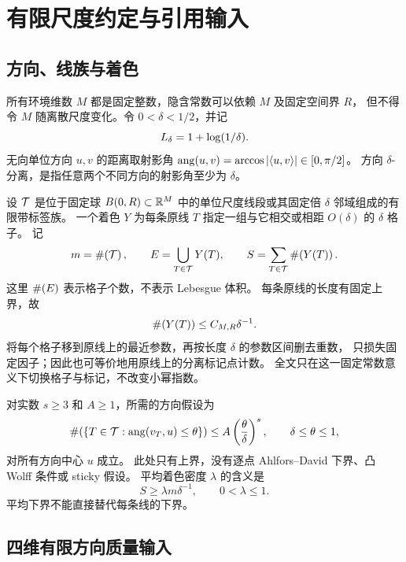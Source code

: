 \section{有限尺度约定与引用输入}\label{sec:preliminaries}

\subsection{方向、线族与着色}
所有环境维数 $M$ 都是固定整数，隐含常数可以依赖 $M$ 及固定空间界 $R$，
但不得令 $M$ 随离散尺度变化。令 $0<\delta<1/2$，并记
\[
  L_\delta=1+\log(1/\delta).
\]
无向单位方向 $u,v$ 的距离取射影角
$\operatorname{ang}(u,v)=\arccos|\langle u,v\rangle|\in[0,\pi/2]$。
方向 $\delta$-分离，是指任意两个不同方向的射影角至少为 $\delta$。

设 $\mathcal T$ 是位于固定球 $B(0,R)\subset\mathbb R^M$ 中的单位尺度线段或其固定倍 $\delta$ 邻域组成的有限带标签族。
一个着色 $Y$ 为每条原线 $T$ 指定一组与它相交或相距 $O(\delta)$ 的 $\delta$ 格子。
记
\[
 m=\#\!\left(\mathcal T\right),\qquad E=\bigcup_{T\in\mathcal T}Y(T),\qquad
 S=\sum_{T\in\mathcal T}\#\!\left(Y(T)\right).
\]
这里 $\#\!\left(E\right)$ 表示格子个数，不表示 Lebesgue 体积。
每条原线的长度有固定上界，故
\begin{equation}\label{eq:single-line-upper}
  \#\!\left(Y(T)\right)\le C_{M,R}\delta^{-1}.
\end{equation}
将每个格子移到原线上的最近参数，再按长度 $\delta$ 的参数区间删去重数，
只损失固定因子；因此也可等价地用原线上的分离标记点计数。
全文只在这一固定常数意义下切换格子与标记，不改变小幂指数。

对实数 $s\ge3$ 和 $A\ge1$，所需的方向假设为
\begin{equation}\label{eq:angular-cap}
 \#\!\left(\{T\in\mathcal T:\operatorname{ang}(v_T,u)\le\theta\}\right)
 \le A\left(\frac\theta\delta\right)^s,
 \qquad \delta\le\theta\le1,
\end{equation}
对所有方向中心 $u$ 成立。
此处只有上界，没有逐点 Ahlfors--David 下界、凸 Wolff 条件或 sticky 假设。
平均着色密度 $\lambda$ 的含义是
\begin{equation}\label{eq:mean-density}
 S\ge\lambda m\delta^{-1},\qquad 0<\lambda\le1.
\end{equation}
平均下界不能直接替代每条线的下界。

\subsection{四维有限方向质量输入}

